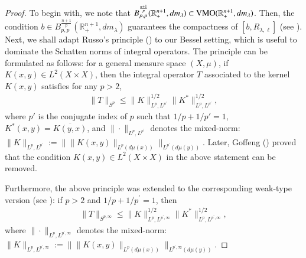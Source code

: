 \documentclass[12pt]{amsart}
\begin{document}
\begin{proof}
To begin with, we {\color{red}note that $B_{p,p}^{\frac{n+1}{p}}(\mathbb{R}_+^{n+1},dm_\lambda)\subset {\rm VMO}(\mathbb{R}_+^{n+1},dm_\lambda)$. Then, the condition $b\in B_{p,p}^{\frac{n+1}{p}}(\mathbb R_+^{n+1},dm_\lambda)$ guarantees the compactness of $[b,R_{\lambda,\ell}]$ (see \cite[Theorem 5.3]{CY}).} Next, we shall adapt Russo's  principle (\cite{Russo}) to our Bessel setting, which is useful to dominate the Schatten norms of integral operators. The principle can be formulated as follows: for a general measure space $(X,\mu)$, if $K(x,y)\in  L^{2}(X\times X)$, then the integral operator $T$ associated to the kernel $K(x,y)$ satisfies for any $p>2$,
\begin{align*}
\|T\|_{S^{p}}\leq \|K\|_{L^p,L^{p^{\prime}}}^{1/2}\|K^{*}\|_{L^p,L^{p^{\prime}}}^{1/2},
\end{align*}
where $p'$ is the conjugate index of $p$ such that $1/p+1/p'=1$, $K^{*}(x,y)=\overline{K(y,x)}$, and $\|\cdot\|_{L^p, L^{p^{\prime}}}$ denotes the mixed-norm:
$
\|K\|_{L^p,L^{p^{\prime}}}:=\big\|\|K(x,y)\|_{L^p(d\mu(x))}\big\|_{L^{p^{\prime}}(d\mu(y))}.
$
Later, Goffeng (\cite{Goffeng}) proved that the condition $K(x,y)\in  L^{2}(X\times X)$ in the above statement can be removed.

Furthermore, the above principle was extended to the corresponding weak-type version (see \cite[Lemma 1 and Lemma 2]{JW}): if $p>2$ and $1/p+1/p^{\prime}=1$, then
\begin{align}\label{integral}
\|T\|_{S^{p,\infty}}\leq \|K\|_{L^{p},L^{p^{\prime},\infty}}^{1/2}\|K^{*}\|_{L^{p},L^{p^{\prime},\infty}}^{1/2},
\end{align}
where $\|\cdot\|_{L^p, L^{p^{\prime},\infty}}$ denotes the mixed-norm:
$
\|K\|_{L^p,L^{p^{\prime},\infty}}:=\big\|\|K(x,y)\|_{L^p(d\mu(x))}\big\|_{L^{p^{\prime},\infty}(d\mu(y))}.
$


\end{proof}
\end{document}
